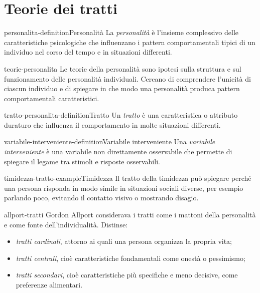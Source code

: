 \documentclass[preview]{standalone}
\begin{document}
\genpage

\section{Teorie dei tratti}

\begin{snippetdefinition}{personalita-definition}{Personalità}
    La \emph{personalità} è l'insieme complessivo delle caratteristiche
    psicologiche che influenzano i pattern comportamentali tipici di un
    individuo nel corso del tempo e in situazioni differenti.
\end{snippetdefinition}

\begin{snippet}{teorie-personalita}
    Le teorie della personalità sono ipotesi sulla struttura e sul funzionamento
    delle personalità individuali. Cercano di comprendere l'unicità di ciascun
    individuo e di spiegare in che modo una personalità produca pattern
    comportamentali caratteristici.
\end{snippet}

\begin{snippetdefinition}{tratto-personalita-definition}{Tratto}
    Un \emph{tratto} è una caratteristica o attributo duraturo che influenza il
    comportamento in molte situazioni differenti.
\end{snippetdefinition}

\begin{snippetdefinition}{variabile-interveniente-definition}{Variabile interveniente}
    Una \emph{variabile interveniente} è una variabile non direttamente
    osservabile che permette di spiegare il legame tra stimoli e risposte
    osservabili.
\end{snippetdefinition}

\begin{snippetexample}{timidezza-tratto-example}{Timidezza}
    Il tratto della timidezza può spiegare perché una persona risponda in modo
    simile in situazioni sociali diverse, per esempio parlando poco, evitando il
    contatto visivo o mostrando disagio.
\end{snippetexample}

\begin{snippet}{allport-tratti}
    Gordon Allport considerava i tratti come i mattoni della personalità e come
    fonte dell'individualità. Distinse:
    \begin{itemize}
        \item \emph{tratti cardinali}, attorno ai quali una persona organizza
        la propria vita;
        \item \emph{tratti centrali}, cioè caratteristiche fondamentali come
        onestà o pessimismo;
        \item \emph{tratti secondari}, cioè caratteristiche più specifiche e
        meno decisive, come preferenze alimentari.
    \end{itemize}
\end{snippet}
\end{document}
